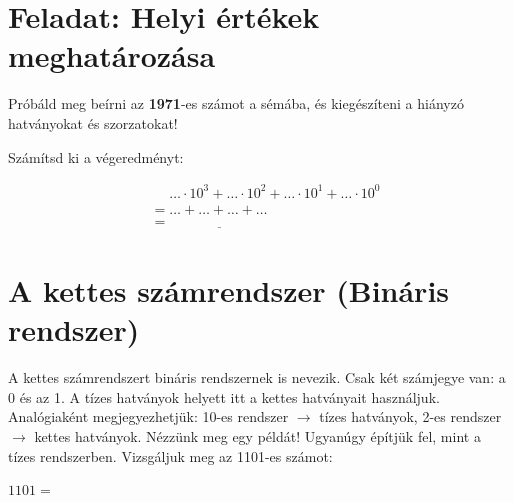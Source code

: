 \documentclass{article}
\begin{document}
\section*{Feladat: Helyi értékek meghatározása}
Próbáld meg beírni az \textbf{1971}-es számot a sémába, és kiegészíteni a hiányzó hatványokat és szorzatokat!

\vspace{0.5cm}

\begin{center}
\end{center}

\vspace{0.8cm}
Számítsd ki a végeredményt:
\begin{center}
\begin{align*}
  &\phantom{= } \dots \cdot 10^3 + \dots \cdot 10^2 + \dots \cdot 10^1 + \dots \cdot 10^0 \\
  &= \dots + \dots + \dots + \dots \\
  &= \underline{\hspace{3cm}}
\end{align*}
\end{center}

\newpage

\section{A kettes számrendszer (Bináris rendszer)}
A kettes számrendszert bináris rendszernek is nevezik. Csak két számjegye van: a 0 és az 1. A tízes hatványok helyett itt a kettes hatványait használjuk. Analógiaként megjegyezhetjük: 10-es rendszer $\rightarrow$ tízes hatványok, 2-es rendszer $\rightarrow$ kettes hatványok. Nézzünk meg egy példát! Ugyanúgy építjük fel, mint a tízes rendszerben. Vizsgáljuk meg az 1101-es számot:

\begin{center}
$1101 = $
\end{center}
\end{document}
